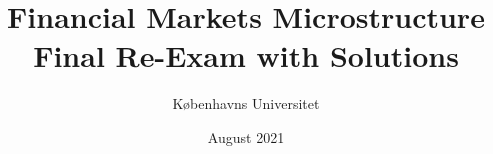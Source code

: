 \documentclass[11pt]{exam}
\begin{document}
	
	\title{Financial Markets Microstructure\\
		Final Re-Exam with Solutions}
	\author{K{\o}benhavns Universitet}
	\date{August 2021}
	\maketitle
	
	
	
\end{document}
